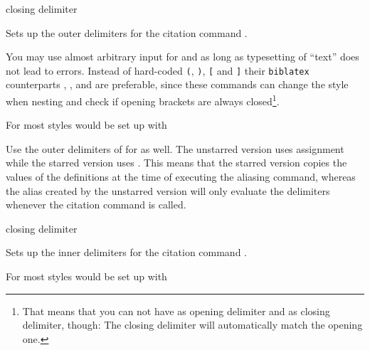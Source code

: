 \documentclass{ltxdockit}
\def\sty{\texttt}
\begin{document}
\begin{ltxsyntax}
        {closing delimiter}

Sets up the outer delimiters for the citation command
.

You may use almost arbitrary input for  and
 as long as typesetting of
\enquote{text} does not lead to
errors.
Instead of hard-coded \texttt{(}, \texttt{)}, \texttt{[} and \texttt{]} their
\sty{biblatex} counterparts , ,
 and  are preferable, since these
commands can change the style when nesting and check if opening brackets
are always closed\footnote{That means that you can not have 
as opening delimiter and  as closing delimiter, though:
The closing delimiter will automatically match the opening one.}.

For most styles  would be set up with
\begin{ltxexample}
\end{ltxexample}


Use the outer delimiters of  for
 as well.
The unstarred version uses  assignment while the starred version uses
. This means that the starred version copies the values of the
definitions at the time of executing the aliasing command,
whereas the alias created by the unstarred version will only evaluate the
delimiters whenever the citation command is called.


        {closing delimiter}

Sets up the inner delimiters for the citation command
.

For most styles  would be set up with
\begin{ltxexample}
\end{ltxexample}


\end{ltxsyntax}
\end{document}
